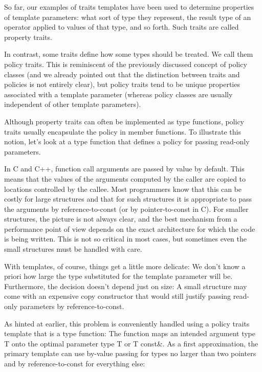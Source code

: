 
So far, our examples of traits templates have been used to determine properties of template parameters: what sort of type they represent, the result type of an operator applied to values of that type, and so forth. Such traits are called property traits.

In contrast, some traits define how some types should be treated. We call them policy traits. This is reminiscent of the previously discussed concept of policy classes (and we already pointed out that the distinction between traits and policies is not entirely clear), but policy traits tend to be unique properties associated with a template parameter (whereas policy classes are usually independent of other template parameters).

Although property traits can often be implemented as type functions, policy traits usually encapsulate the policy in member functions. To illustrate this notion, let’s look at a type function that defines a policy for passing read-only parameters.


In C and C++, function call arguments are passed by value by default. This means that the values of the arguments computed by the caller are copied to locations controlled by the callee. Most programmers know that this can be costly for large structures and that for such structures it is appropriate to pass the arguments by reference-to-const (or by pointer-to-const in C). For smaller structures, the picture is not always clear, and the best mechanism from a performance point of view depends on the exact architecture for which the code is being written. This is not so critical in most cases, but sometimes even the small structures must be handled with care.

With templates, of course, things get a little more delicate: We don’t know a priori how large the type substituted for the template parameter will be. Furthermore, the decision doesn’t depend just on size: A small structure may come with an expensive copy constructor that would still justify passing read-only parameters by reference-to-const.

As hinted at earlier, this problem is conveniently handled using a policy traits template that is a type function: The function maps an intended argument type T onto the optimal parameter type T or T const\&. As a first approximation, the primary template can use by-value passing for types no larger than two pointers and by reference-to-const for everything else:

